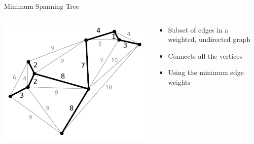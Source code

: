 \documentclass[aspectratio=169]{beamer}
\begin{document}
\begin{frame}{Minimum Spanning Tree}

\begin{columns}
\begin{column}{0.5\textwidth}
\includegraphics[width=1\textwidth]{./lectUL/Minimum_spanning_tree.pdf}
\end{column}
\begin{column}{0.5\textwidth}
\begin{itemize}
\item Subset of edges in a weighted, undirected graph 
\item Connects all the vertices
\item Using the minimum edge weights
\end{itemize}
\end{column}
\end{columns}

\end{frame}
\end{document}
